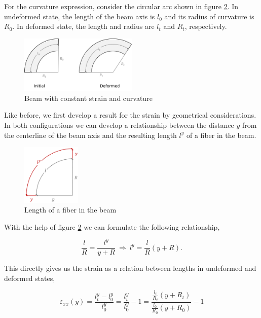 For the curvature expression, consider the circular arc shown in figure \ref{fig:beam-kinematics-verification-3}.
In undeformed state, the length of the beam axis is $l_{0}$ and its radius of curvature is $R_{0}$.
In deformed state, the length and radius are $l_{t}$ and $R_{t}$, respectively.

\begin{figure}[h]
\centering
\includegraphics[width=0.5\textwidth]{figures/elements/beam-kinematics-verification-2}
\caption{Beam with constant strain and curvature}
\label{fig:beam-kinematics-verification-2}
\end{figure}

Like before, we first develop a result for the strain by geometrical considerations.
In both configurations we can develop a relationship between the distance $y$ from the centerline of the beam axis and the resulting length $l^y$ of a fiber in the beam.

\begin{figure}[h]
\centering
\includegraphics[width=0.25\textwidth]{figures/elements/beam-kinematics-verification-3}
\caption{Length of a fiber in the beam}
\label{fig:beam-kinematics-verification-3}
\end{figure}

With the help of figure \ref{fig:beam-kinematics-verification-3} we can formulate the following relationship,

\begin{equation}
\frac{l}{R} = \frac{l^y}{y + R} \ \Rightarrow\ l^y = \frac{l}{R}(y + R).
\end{equation}

This directly gives us the strain as a relation between lengths in undeformed and deformed states,

\begin{equation}
\varepsilon_{xx}(y) = \frac{l_t^y - l_0^y}{l_0^y} = \frac{l_t^y}{l_0^y} - 1 = \frac{\frac{l_t}{R_t}(y + R_t)}{\frac{l_0}{R_0}(y + R_0)} - 1
\end{equation}

